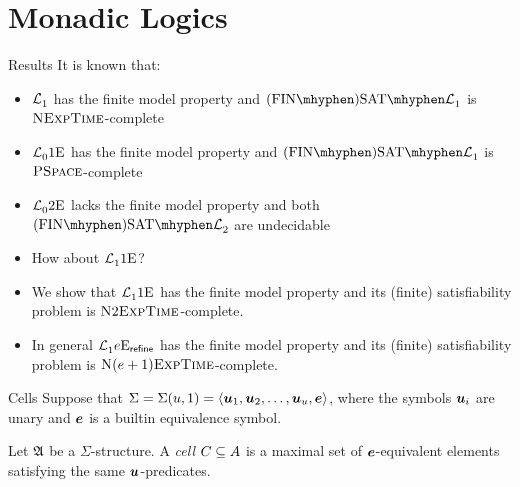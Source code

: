\documentclass{beamer}
\begin{document}
\section{Monadic Logics}
\begin{frame}{Results}
It is known that:
\begin{itemize}
  \item $\mathcal{L}^{{}}_{1}$ has the finite model property and
  $\FinASat{\Lvp\LL\nonv1}$ is $\text{\normalfont{\scshape NExpTime}}$-complete
  \item $\mathcal{L}^{{}}_{0}{1}\mathrm{E}_{{}}$ has the finite model property and
  $\FinASat{\Lvp\LL\nonv1}$ is $\text{\normalfont{\scshape PSpace}}$-complete
  \item $\mathcal{L}^{{}}_{0}{2}\mathrm{E}_{{}}$ lacks the finite model property and both
  $\FinASat{\Lvp\LL\nonv2}$ are undecidable
  \pause
  \item How about $\mathcal{L}^{{}}_{1}{1}\mathrm{E}_{{}}$?
  \pause
  \item We show that $\mathcal{L}^{{}}_{1}{1}\mathrm{E}_{{}}$ has the finite model property and
  its (finite) satisfiability problem is $\text{\normalfont{\scshape N}}2\text{\normalfont{\scshape ExpTime}}$-complete.
  \item In general $\mathcal{L}^{{}}_{1}{e}\mathrm{E}_{\mathsf{refine}}$ has the finite model
  property and its (finite) satisfiability problem is
  $\text{\normalfont{\scshape N}}(e+1)\text{\normalfont{\scshape ExpTime}}$-complete.
\end{itemize}
\end{frame}

\begin{frame}{Cells}
Suppose that $\Sigma = \Sigma(u,1) = \left\langle \bm{u}_{1},\bm{u}_{2},\dots,\bm{u}_{u},\bm{e} \right\rangle$,
where the symbols $\bm{u}_{i}$ are unary and $\bm{e}$ is a builtin equivalence symbol.

Let $\mathfrak{A}$ be a $\Sigma$-structure.
A \emph{cell} $C\subseteq A$ is a maximal set of $\bm{e}$-equivalent elements
satisfying the same $\bm{u}$-predicates.
\end{frame}
\end{document}
